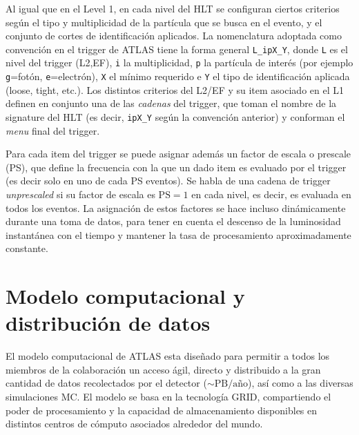 Al igual que en el Level 1, en cada nivel del HLT se configuran ciertos
criterios según el tipo y multiplicidad de la partícula que se busca en el
evento, y el conjunto de cortes de identificación aplicados. La nomenclatura
adoptada como convención en el trigger de ATLAS tiene la forma general
\texttt{L\_ipX\_Y}, donde \texttt{L} es el nivel del trigger (L2,EF), \texttt{i}
la multiplicidad, \texttt{p} la partícula de interés (por ejemplo
\texttt{g}=fotón, \texttt{e}=electrón), \texttt{X} el {\pt} mínimo requerido e
\texttt{Y} el tipo de identificación aplicada (loose, tight, etc.). Los
distintos criterios del L2/EF y su item asociado en el L1 definen en conjunto
una de las \emph{cadenas} del trigger, que toman el nombre de la signature del
HLT (es decir,  \texttt{ipX\_Y} según la convención anterior) y conforman el \emph{menu} final
del trigger.

Para cada item del trigger se puede asignar además
un factor de escala o prescale (PS), que define la frecuencia con la que un dado
item es evaluado por el trigger (es decir solo en uno de cada PS eventos).
Se habla de una cadena de trigger \emph{unprescaled} si su factor de escala es
$\text{PS} = 1$ en cada nivel, es decir, es evaluada en todos los eventos. La asignación de estos
factores se hace incluso dinámicamente durante una toma de datos, para tener en
cuenta el descenso de la luminosidad instantánea con el tiempo y mantener la
tasa de procesamiento aproximadamente constante.



\section{Modelo computacional y distribución de datos}

El modelo computacional de ATLAS esta diseñado para permitir a todos los
miembros de la colaboración un acceso ágil, directo y distribuido a la gran
cantidad de datos recolectados por el detector ($\sim \text{PB}/\text{a\~no}$),
así como a las diversas simulaciones MC. El modelo se basa en la tecnología
GRID, compartiendo el poder de procesamiento y la capacidad de almacenamiento
disponibles en distintos centros de cómputo asociados alrededor del mundo.

